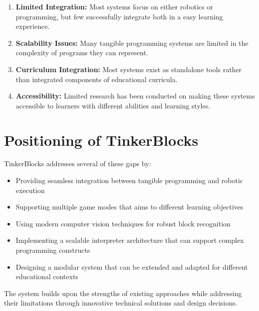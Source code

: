\begin{enumerate}
    \item \textbf{Limited Integration:} Most systems focus on either robotics or programming, but few successfully integrate both in a easy learning experience.
    
    \item \textbf{Scalability Issues:} Many tangible programming systems are limited in the complexity of programs they can represent.
    
    \item \textbf{Curriculum Integration:} Most systems exist as standalone tools rather than integrated components of educational curricula.
    
    \item \textbf{Accessibility:} Limited research has been conducted on making these systems accessible to learners with different abilities and learning styles.
\end{enumerate}

\section{Positioning of TinkerBlocks}

TinkerBlocks addresses several of these gaps by:

\begin{itemize}
    \item Providing seamless integration between tangible programming and robotic execution
    \item Supporting multiple game modes that aims to different learning objectives
    \item Using modern computer vision techniques for robust block recognition
    \item Implementing a scalable interpreter architecture that can support complex programming constructs
    \item Designing a modular system that can be extended and adapted for different educational contexts
\end{itemize}

The system builds upon the strengths of existing approaches while addressing their limitations through innovative technical solutions and design decisions.